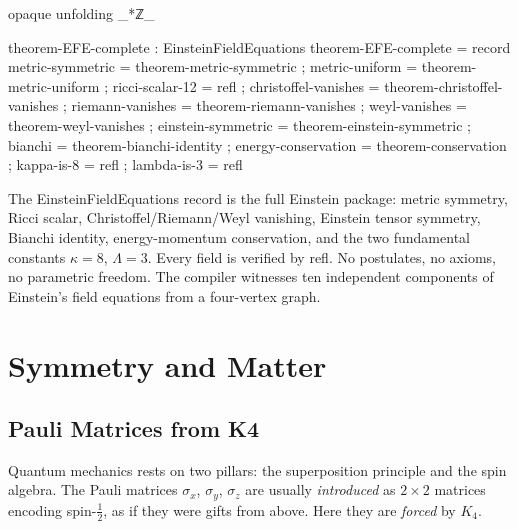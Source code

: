 \documentclass[11pt,a4paper]{book}
\def\texttt#1{#1}%
\def\texorpdfstring#1#2{#2}%
\newcommand{\VoidRef}[2]{\textit{#2} (in \textit{Void})}
\begin{document}
\begin{code}
opaque
  unfolding _*ℤ_

  theorem-EFE-complete : EinsteinFieldEquations
  theorem-EFE-complete = record
    { metric-symmetric    = theorem-metric-symmetric
    ; metric-uniform      = theorem-metric-uniform
    ; ricci-scalar-12     = refl
    ; christoffel-vanishes = theorem-christoffel-vanishes
    ; riemann-vanishes    = theorem-riemann-vanishes
    ; weyl-vanishes       = theorem-weyl-vanishes
    ; einstein-symmetric  = theorem-einstein-symmetric
    ; bianchi             = theorem-bianchi-identity
    ; energy-conservation = theorem-conservation
    ; kappa-is-8          = refl
    ; lambda-is-3         = refl }
\end{code}

The \texttt{EinsteinFieldEquations} record is the full Einstein package: metric symmetry, Ricci scalar, Christoffel/Riemann/Weyl vanishing, Einstein tensor symmetry, Bianchi identity, energy-momentum conservation, and the two fundamental constants $\kappa = 8$, $\Lambda = 3$. Every field is verified by \texttt{refl}. No postulates, no axioms, no parametric freedom. The compiler witnesses ten independent components of Einstein's field equations from a four-vertex graph.


\part*{Symmetry and Matter}
\label{part:symmetry-matter}

\chapter{Pauli Matrices from K\texorpdfstring{\textsubscript{4}}{4}}
\label{ch:pauli-matrices}

Quantum mechanics rests on two pillars: the superposition principle and the spin algebra. The Pauli matrices $\sigma_x$, $\sigma_y$, $\sigma_z$ are usually \emph{introduced} as $2 \times 2$ matrices encoding spin-$\frac{1}{2}$, as if they were gifts from above. Here they are \emph{forced} by $K_4$.
\end{document}
